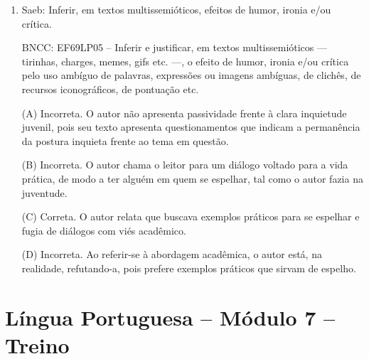 \begin{enumerate}
(D) Incorreta. Por ser
um texto voltado para o humor, pressupõe-se o posicionamento crítico
frente ao fato, isto é, a parcialidade é que se faz presente.

\item

Saeb: Inferir, em textos multissemióticos, efeitos de humor, ironia e/ou
crítica. 

BNCC: EF69LP05 -- Inferir e justificar, em textos
multissemióticos --- tirinhas, charges, memes, gifs etc. ---, o efeito
de humor, ironia e/ou crítica pelo uso ambíguo de palavras, expressões
ou imagens ambíguas, de clichês, de recursos iconográficos, de pontuação
etc.


(A) Incorreta. O autor não apresenta passividade frente à clara
inquietude juvenil, pois seu texto apresenta questionamentos que indicam
a permanência da postura inquieta frente ao tema em questão. 

(B)
Incorreta. O autor chama o leitor para um diálogo voltado para a vida
prática, de modo a ter alguém em quem se espelhar, tal como o autor
fazia na juventude. 

(C) Correta. O autor relata que buscava exemplos
práticos para se espelhar e fugia de diálogos com viés acadêmico. 

(D)
Incorreta. Ao referir-se à abordagem acadêmica, o autor está, na
realidade, refutando-a, pois prefere exemplos práticos que sirvam de
espelho.
\end{enumerate}

\section*{Língua Portuguesa – Módulo 7 – Treino}

